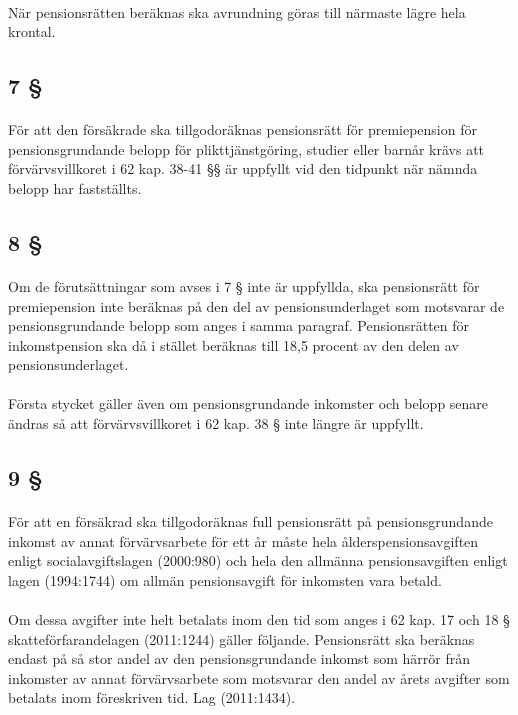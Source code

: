\documentclass[a4paper,notitlepage,openany,10pt]{book}
\begin{document}
\paragraph*{}
När pensionsrätten beräknas ska avrundning göras till närmaste lägre hela krontal.
\subsection*{7 §}
\paragraph*{}
För att den försäkrade ska tillgodoräknas pensionsrätt för premiepension för pensionsgrundande belopp för plikttjänstgöring, studier eller barnår krävs att förvärvsvillkoret i 62 kap. 38-41 §§ är uppfyllt vid den tidpunkt när nämnda belopp har fastställts.
\subsection*{8 §}
\paragraph*{}
Om de förutsättningar som avses i 7 § inte är uppfyllda, ska pensionsrätt för premiepension inte beräknas på den del av pensionsunderlaget som motsvarar de pensionsgrundande belopp som anges i samma paragraf. Pensionsrätten för inkomstpension ska då i stället beräknas till 18,5 procent av den delen av pensionsunderlaget.
\paragraph*{}
Första stycket gäller även om pensionsgrundande inkomster och belopp senare ändras så att förvärvsvillkoret i 62 kap. 38 § inte längre är uppfyllt.
\subsection*{9 §}
\paragraph*{}
För att en försäkrad ska tillgodoräknas full pensionsrätt på pensionsgrundande inkomst av annat förvärvsarbete för ett år måste hela ålderspensionsavgiften enligt socialavgiftslagen (2000:980) och hela den allmänna pensionsavgiften enligt lagen (1994:1744) om allmän pensionsavgift för inkomsten vara betald.
\paragraph*{}
Om dessa avgifter inte helt betalats inom den tid som anges i 62 kap. 17 och 18 § skatteförfarandelagen (2011:1244) gäller följande. Pensionsrätt ska beräknas endast på så stor andel av den pensionsgrundande inkomst som härrör från inkomster av annat förvärvsarbete som motsvarar den andel av årets avgifter som betalats inom föreskriven tid.
Lag (2011:1434).
\end{document}
